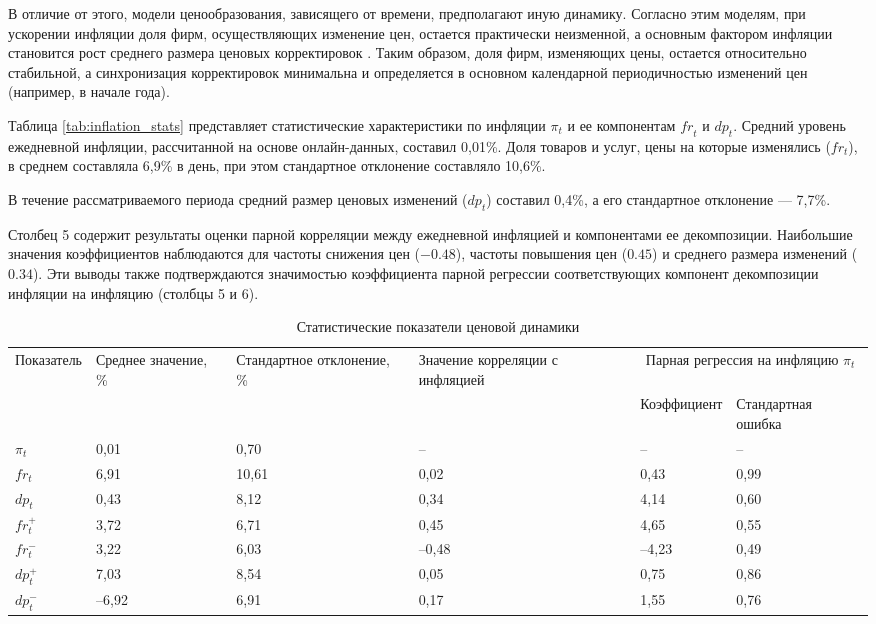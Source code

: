 В отличие от этого, модели ценообразования, зависящего от времени, предполагают иную динамику. Согласно этим моделям, при ускорении инфляции доля фирм, осуществляющих изменение цен, остается практически неизменной, а основным фактором инфляции становится рост среднего размера ценовых корректировок \cite{Taylor1980, Calvo1983}. Таким образом, доля фирм, изменяющих цены, остается относительно стабильной, а синхронизация корректировок минимальна и определяется в основном календарной периодичностью изменений цен (например, в начале года).

Таблица \ref{tab:inflation_stats} представляет статистические характеристики по инфляции $\pi_t$ и ее компонентам $\mathit{fr}_t$ и $\mathit{dp}_t$. Средний уровень ежедневной инфляции, рассчитанной на основе онлайн-данных, составил 0,01\%. Доля товаров и услуг, цены на которые изменялись (\( fr_t \)), в среднем составляла 6,9\% в день, при этом стандартное отклонение составляло 10,6\%.  

В течение рассматриваемого периода средний размер ценовых изменений (\( dp_t \)) составил 0,4\%, а его стандартное отклонение — 7,7\%.  

Столбец 5 содержит результаты оценки парной корреляции между ежедневной инфляцией и компонентами ее декомпозиции. Наибольшие значения коэффициентов наблюдаются для частоты снижения цен (\(-0.48\)), частоты повышения цен (\(0.45\)) и среднего размера изменений (\(0.34\)).  Эти выводы также подтверждаются значимостью коэффициента парной регрессии соответствующих компонент декомпозиции инфляции на инфляцию (столбцы 5 и 6).

\begin{table}[h]
	\centering
	\small  %
	\caption{Статистические показатели ценовой динамики}
	\label{tab:stats}
	\begin{tabularx}{\textwidth}{|X|X|X|X|X|X|}
		\hline
		Показатель & Среднее значение, \% & Стандартное отклонение, \% & Значение корреляции с инфляцией & \multicolumn{2}{c|}{Парная регрессия на инфляцию $\pi_t$} \\
		\cline{5-6}
		& & & & Коэффициент & Стандартная ошибка \\
		\hline
		$\pi_t$         & 0,01  & 0,70  & –     & –     & –    \\
		$fr_t$         & 6,91  & 10,61 & 0,02  & 0,43  & 0,99 \\
		$dp_t$         & 0,43  & 8,12  & 0,34  & 4,14  & 0,60 \\
		$fr_t^{+}$     & 3,72  & 6,71  & 0,45  & 4,65  & 0,55 \\
		$fr_t^{-}$     & 3,22  & 6,03  & –0,48 & –4,23 & 0,49 \\
		$dp_t^{+}$     & 7,03  & 8,54  & 0,05  & 0,75  & 0,86 \\
		$dp_t^{-}$     & –6,92 & 6,91  & 0,17  & 1,55  & 0,76 \\
		\hline
	\end{tabularx}
\end{table}

